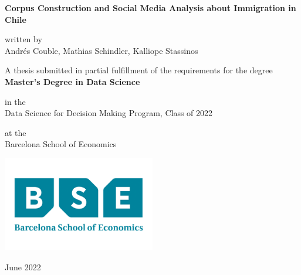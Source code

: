 \begin{titlepage}
   \begin{center}
       \vspace*{1cm}

        \Huge{\textbf{Corpus Construction and Social Media Analysis about Immigration in Chile}}
        
        \normalsize

            
       \vspace{1.5em}
       
       {\large written by \\}
        \vspace{1.5em}
       {\LARGE Andrés Couble, \LARGE Mathias Schindler, \LARGE Kalliope Stassinos}

       \vspace{1.5cm}
                    
       \large{A thesis submitted in partial fulfillment of the requirements for the degree \\
       \vspace{2em}
       \textbf{\Large Master's Degree in Data Science}}
       
       \vspace{1.5em}
       \large{in the \\
       \vspace{1.5em}
       {\Large Data Science for Decision Making Program, Class of 2022}}
        
        \vspace{1.5em}
       \large{at the \\
       \vspace{1.5em}
       {\Large Barcelona  School of Economics}}
            
       \vspace{0.3cm}
     
       \includegraphics[width=0.5\textwidth]{figs/logo_bse_640x400.png}
       
       
       June 2022
            
   \end{center}
\end{titlepage}